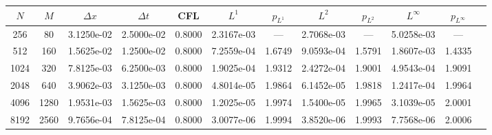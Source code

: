 \begin{tabular}{cccccccccccc}
\toprule
$N$ & $M$ & $\Delta x$ & $\Delta t$ & CFL & $L^1$ & $p_{L^1}$ & $L^2$ & $p_{L^2}$ & $L^\infty$ & $p_{L^\infty}$ \\
\midrule
256 & 80 & 3.1250e-02 & 2.5000e-02 & 0.8000 & 2.3167e-03 & --- & 2.7068e-03 & --- & 5.0258e-03 & --- \\
512 & 160 & 1.5625e-02 & 1.2500e-02 & 0.8000 & 7.2559e-04 & 1.6749 & 9.0593e-04 & 1.5791 & 1.8607e-03 & 1.4335 \\
1024 & 320 & 7.8125e-03 & 6.2500e-03 & 0.8000 & 1.9025e-04 & 1.9312 & 2.4272e-04 & 1.9001 & 4.9543e-04 & 1.9091 \\
2048 & 640 & 3.9062e-03 & 3.1250e-03 & 0.8000 & 4.8014e-05 & 1.9864 & 6.1452e-05 & 1.9818 & 1.2417e-04 & 1.9964 \\
4096 & 1280 & 1.9531e-03 & 1.5625e-03 & 0.8000 & 1.2025e-05 & 1.9974 & 1.5400e-05 & 1.9965 & 3.1039e-05 & 2.0001 \\
8192 & 2560 & 9.7656e-04 & 7.8125e-04 & 0.8000 & 3.0077e-06 & 1.9994 & 3.8520e-06 & 1.9993 & 7.7568e-06 & 2.0006 \\
\bottomrule
\end{tabular}